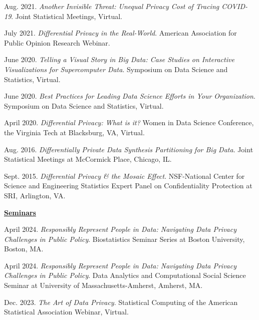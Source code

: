 \begin{etaremune}[topsep=0pt, itemsep=4pt, partopsep=0pt, parsep=0pt]
    \item Aug. 2021. \textit{Another Invisible Threat: Unequal Privacy Cost of Tracing COVID-19}. Joint Statistical Meetings, Virtual.
    
    \item July 2021. \textit{Differential Privacy in the Real-World}. American Association for Public Opinion Research Webinar.

    \item June 2020. \textit{Telling a Visual Story in Big Data: Case Studies on Interactive Visualizations for Supercomputer Data}. Symposium on Data Science and Statistics, Virtual.
  
    \item June 2020. \textit{Best Practices for Leading Data Science Efforts in Your Organization}. Symposium on Data Science and Statistics, Virtual.
  
    \item April 2020. \textit{Differential Privacy: What is it?} Women in Data Science Conference, the Virginia Tech at Blacksburg, VA, Virtual.

    \item Aug. 2016. \textit{Differentially Private Data Synthesis Partitioning for Big Data}. Joint Statistical Meetings at McCormick Place, Chicago, IL.
    
    \item Sept. 2015. \textit{Differential Privacy \& the Mosaic Effect}. NSF-National Center for Science and Engineering Statistics Expert Panel on Confidentiality Protection at SRI, Arlington, VA.

\vspace{6pt}
\hspace{-0.30in}\underline{\textbf{\large Seminars}}\normalsize
    \item April 2024. \textit{Responsibly Represent People in Data: Navigating Data Privacy Challenges in Public Policy}. Biostatistics Seminar Series at Boston University, Boston, MA.
    
    \item April 2024. \textit{Responsibly Represent People in Data: Navigating Data Privacy Challenges in Public Policy}.  Data Analytics and Computational Social Science Seminar at University of Massachusetts-Amherst, Amherst, MA.
    
    \item Dec. 2023. \textit{The Art of Data Privacy}. Statistical Computing of the American Statistical Association Webinar, Virtual.


\end{etaremune}
